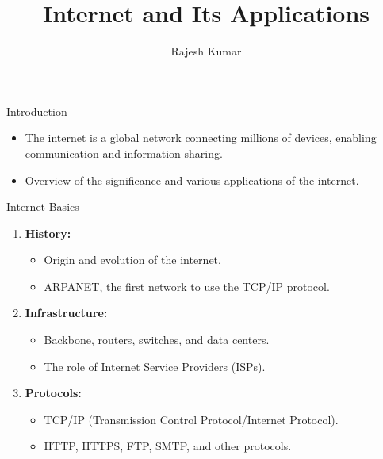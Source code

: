\title{Internet and Its Applications}
\author{Rajesh Kumar}
\date{}


\begin{frame}
  \titlepage
\end{frame}

\begin{frame}{Introduction}
  \begin{itemize}
    \item The internet is a global network connecting millions of devices, enabling communication and information sharing.
    \item Overview of the significance and various applications of the internet.
  \end{itemize}
\end{frame}

\begin{frame}{Internet Basics}
  \begin{enumerate}
    \item \textbf{History:}
      \begin{itemize}
        \item Origin and evolution of the internet.
        \item ARPANET, the first network to use the TCP/IP protocol.
      \end{itemize}
    \item \textbf{Infrastructure:}
      \begin{itemize}
        \item Backbone, routers, switches, and data centers.
        \item The role of Internet Service Providers (ISPs).
      \end{itemize}
    \item \textbf{Protocols:}
      \begin{itemize}
        \item TCP/IP (Transmission Control Protocol/Internet Protocol).
        \item HTTP, HTTPS, FTP, SMTP, and other protocols.
      \end{itemize}
  \end{enumerate}
\end{frame}

